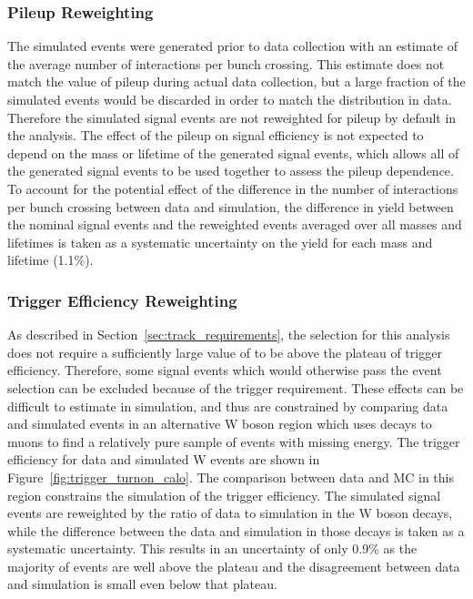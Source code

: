 \subsubsection{Pileup Reweighting}
The simulated events were generated prior to data collection with an estimate of the average number of interactions per bunch crossing.
This estimate does not match the value of pileup during actual data collection, but a large fraction of the simulated events would be discarded in order to match the distribution in data.
Therefore the simulated signal events are not reweighted for pileup by default in the analysis.
The effect of the pileup on signal efficiency is not expected to depend on the mass or lifetime of the generated signal events, which allows all of the generated signal events to be used together to assess the pileup dependence.
To account for the potential effect of the difference in the number of interactions per bunch crossing between data and simulation, the difference in yield between the nominal signal events and the reweighted events averaged over all masses and lifetimes is taken as a systematic uncertainty on the yield for each mass and lifetime (1.1\%).

\subsubsection{Trigger Efficiency Reweighting}
As described in Section~\ref{sec:track_requirements}, the selection for this analysis does not require a sufficiently large value of \met to be above the plateau of trigger efficiency.
Therefore, some signal events which would otherwise pass the event selection can be excluded because of the trigger requirement.
These effects can be difficult to estimate in simulation, and thus are constrained by comparing data and simulated events in an alternative W boson region which uses decays to muons to find a relatively pure sample of events with missing energy.
The trigger efficiency for data and simulated W events are shown in Figure~\ref{fig:trigger_turnon_calo}.
The comparison between data and MC in this region constrains the simulation of the trigger efficiency.
The simulated signal events are reweighted by the ratio of data to simulation in the W boson decays, while the difference between the data and simulation in those decays is taken as a systematic uncertainty.
This results in an uncertainty of only 0.9\% as the majority of events are well above the plateau and the disagreement between data and simulation is small even below that plateau.

